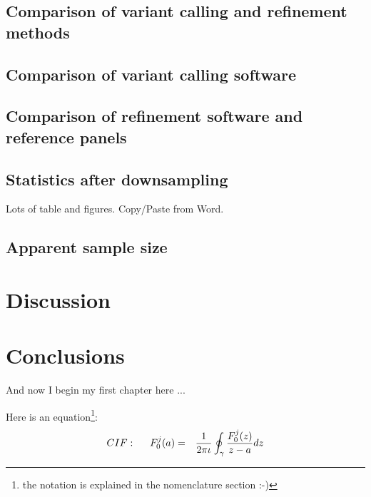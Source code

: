 \subsection{Comparison of variant calling and refinement methods}
\subsection{Comparison of variant calling software}
\subsection{Comparison of refinement software and reference panels}
\subsection{Statistics after downsampling}
Lots of table and figures. Copy/Paste from Word.
\subsection{Apparent sample size}
\section{Discussion}
\section{Conclusions}

And now I begin my first chapter here ...

Here is an equation\footnote{the notation is explained in the nomenclature section :-)}:
\begin{eqnarray}
CIF: \hspace*{5mm}F_0^j(a) &=& \frac{1}{2\pi \iota} \oint_{\gamma} \frac{F_0^j(z)}{z - a} dz
\end{eqnarray}
\nomenclature[gp]{$\pi$}{ $\simeq 3.14\ldots$}                                             %

